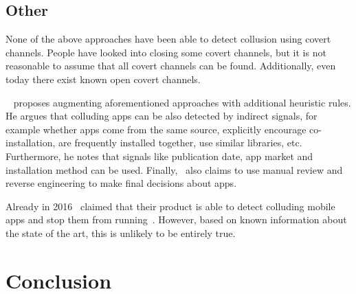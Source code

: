 \documentclass[article, oneside]{aaltoseries}
\newcommand{\TODO}[1]{\todo[inline]{#1}}
\begin{document}
\subsection{Other}
\label{sec:othermethods}

None of the above approaches have been able to detect collusion using covert channels. People have looked into closing some covert channels, but it is not reasonable to assume that all covert channels can be found. Additionally, even today there exist known open covert channels.

\citeauthor{Muttik2016}~\cite{Muttik2016} proposes augmenting aforementioned approaches with additional heuristic rules. He argues that colluding apps can be also detected by indirect signals, for example whether apps come from the same source, explicitly encourage co-installation, are frequently installed together, use similar libraries, etc. Furthermore, he notes that signals like publication date, app market and installation method can be used. Finally,~\citeauthor{McAfee2016} also claims to use manual review and reverse engineering to make final decisions about apps.

Already in 2016~\citeauthor{McAfee2016} claimed that their product is able to detect colluding mobile apps and stop them from running~\cite{McAfee2016}. However, based on known information about the state of the art, this is unlikely to be entirely true.

\section{Conclusion}
\label{sec:conclusion}





\listoftodos
\TODO{remove list of todos}
\end{document}
